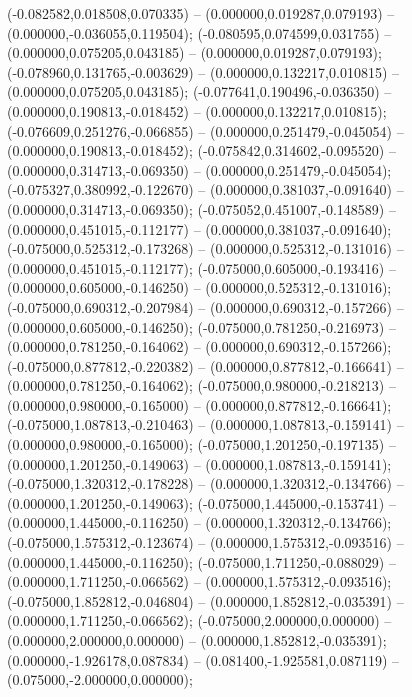  (-0.082582,0.018508,0.070335) -- (0.000000,0.019287,0.079193) -- (0.000000,-0.036055,0.119504);
 (-0.080595,0.074599,0.031755) -- (0.000000,0.075205,0.043185) -- (0.000000,0.019287,0.079193);
 (-0.078960,0.131765,-0.003629) -- (0.000000,0.132217,0.010815) -- (0.000000,0.075205,0.043185);
 (-0.077641,0.190496,-0.036350) -- (0.000000,0.190813,-0.018452) -- (0.000000,0.132217,0.010815);
 (-0.076609,0.251276,-0.066855) -- (0.000000,0.251479,-0.045054) -- (0.000000,0.190813,-0.018452);
 (-0.075842,0.314602,-0.095520) -- (0.000000,0.314713,-0.069350) -- (0.000000,0.251479,-0.045054);
 (-0.075327,0.380992,-0.122670) -- (0.000000,0.381037,-0.091640) -- (0.000000,0.314713,-0.069350);
 (-0.075052,0.451007,-0.148589) -- (0.000000,0.451015,-0.112177) -- (0.000000,0.381037,-0.091640);
 (-0.075000,0.525312,-0.173268) -- (0.000000,0.525312,-0.131016) -- (0.000000,0.451015,-0.112177);
 (-0.075000,0.605000,-0.193416) -- (0.000000,0.605000,-0.146250) -- (0.000000,0.525312,-0.131016);
 (-0.075000,0.690312,-0.207984) -- (0.000000,0.690312,-0.157266) -- (0.000000,0.605000,-0.146250);
 (-0.075000,0.781250,-0.216973) -- (0.000000,0.781250,-0.164062) -- (0.000000,0.690312,-0.157266);
 (-0.075000,0.877812,-0.220382) -- (0.000000,0.877812,-0.166641) -- (0.000000,0.781250,-0.164062);
 (-0.075000,0.980000,-0.218213) -- (0.000000,0.980000,-0.165000) -- (0.000000,0.877812,-0.166641);
 (-0.075000,1.087813,-0.210463) -- (0.000000,1.087813,-0.159141) -- (0.000000,0.980000,-0.165000);
 (-0.075000,1.201250,-0.197135) -- (0.000000,1.201250,-0.149063) -- (0.000000,1.087813,-0.159141);
 (-0.075000,1.320312,-0.178228) -- (0.000000,1.320312,-0.134766) -- (0.000000,1.201250,-0.149063);
 (-0.075000,1.445000,-0.153741) -- (0.000000,1.445000,-0.116250) -- (0.000000,1.320312,-0.134766);
 (-0.075000,1.575312,-0.123674) -- (0.000000,1.575312,-0.093516) -- (0.000000,1.445000,-0.116250);
 (-0.075000,1.711250,-0.088029) -- (0.000000,1.711250,-0.066562) -- (0.000000,1.575312,-0.093516);
 (-0.075000,1.852812,-0.046804) -- (0.000000,1.852812,-0.035391) -- (0.000000,1.711250,-0.066562);
 (-0.075000,2.000000,0.000000) -- (0.000000,2.000000,0.000000) -- (0.000000,1.852812,-0.035391);
 (0.000000,-1.926178,0.087834) -- (0.081400,-1.925581,0.087119) -- (0.075000,-2.000000,0.000000);
